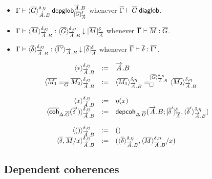 \begin{itemize}
\item
$\wfdepglob{\Gamma}{\interpdepglob{\diag G}{\tel A.B}{\delta}{\eta}}{\tel A.B}
  {\interpglob{\diag G}{\tel A}{\delta}}$
whenever
$\wfdiaglob{\diag\Gamma}{\diag G}$.

\item
$\ofdepglob{\Gamma}{\interpdepglob{\diag M}{\tel A.B}{\delta}{\eta}}
 {\interpdepglob{\diag G}{\tel A.B}{\delta}{\eta}}
 {\interpglob{\diag M}{\tel A}{\delta}}$
whenever
$\ofdiaglob{\diag\Gamma}{\diag M}{\diag G}$.

\item
$\ofinterpdep{\Gamma}
  {\interpdepglob{\diag\delta}{\tel A.B}{\delta}{\eta}}{\diag{\Gamma'}}{\tel A.B}
  {\interpglob{\diag\delta}{\tel A}{\delta}}$
whenever
$\ofdiaglob{\diag\Gamma}{\diag\delta}{\diag{\Gamma'}}$.
\end{itemize}

\[
  \begin{array}{rcl}
    \interpdepglob{\diagbase}{\tel A.B}{\delta}{\eta} & := & \tel A.B \\
    \interpdepglob{\homj{\diag G}{\diag{M_1}}{\diag{M_2}}}
      {\tel A.B}{\delta}{\eta} & := &
    \dhomj
      {\interpdepglob{\diag G}{\tel A.B}{\delta}{\eta}}
      {\interpdepglob{\diag{M_1}}{\tel A.B}{\delta}{\eta}}
      {\interpdepglob{\diag{M_2}}{\tel A.B}{\delta}{\eta}}
      {\blank}
    \\\\

    \interpdepglob{x}{\tel A.B}{\delta}{\eta} & := & \eta(x) \\
    \interpdepglob
      {\diagcoh{\Delta.\diag{G}}{\diag \delta'}}{\tel A.B}{\delta}{\eta} & := &
    \depcoh{\Delta.\diag G}{\tel A.B}
      {\interpglob{\diag\delta'}{\tel A}{\delta}}
      {\interpdepglob{\diag\delta'}{\tel A.B}{\delta}{\eta}} \\\\

    \interpdepglob{()}{\tel A.B}{\delta}{\eta} & := & () \\
    \interpdepglob{\diag\delta,\diag M/x}{\tel A.B}{\delta}{\eta} & := &
    (\interpdepglob{\diag\delta}{\tel A.B}{\delta}{\eta},\interpdepglob{\diag
    M}{\tel A.B}{\delta}{\eta}/x)
  \end{array}
\]

\subsection{Dependent coherences}

